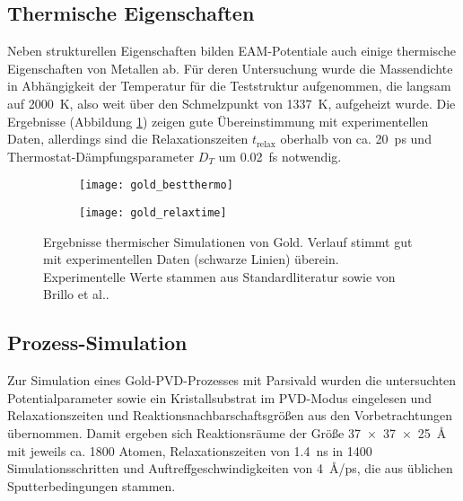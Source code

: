 
\subsection{Thermische Eigenschaften}

Neben strukturellen Eigenschaften bilden EAM-Potentiale auch einige thermische Eigenschaften von Metallen ab.
Für deren Untersuchung wurde die Massendichte in Abhängigkeit der Temperatur für die Teststruktur aufgenommen, die langsam auf \SI{2000}{\kelvin}, also weit über den Schmelzpunkt von \SI{1337}{\kelvin}, aufgeheizt wurde.
Die Ergebnisse (Abbildung \ref{fig:goldthermo}) zeigen gute Übereinstimmung mit experimentellen Daten, allerdings sind die Relaxationszeiten $t_\text{relax}$ oberhalb von ca. \SI{20}{\pico\second} und Thermostat-Dämpfungsparameter $D_T$ um \SI{0.02}{\femto\second} notwendig.

\begin{figure}[tbp]
  \centering
  \captionsetup[subfigure]{singlelinecheck=false}
  \def\subfigwidth{7cm}
  \begin{subfigure}[t]{\subfigwidth}
    \texttt{[image: gold\_bestthermo]}
  \end{subfigure}
  \hfill
  \begin{subfigure}[t]{\subfigwidth}
    \texttt{[image: gold\_relaxtime]}
  \end{subfigure}
  \caption[Ergebnisse thermischer Simulationen von Gold]{Ergebnisse thermischer Simulationen von Gold.
    Verlauf stimmt gut mit experimentellen Daten (schwarze Linien) überein.
    Experimentelle Werte stammen aus Standardliteratur sowie von Brillo et al.\cite{brillo_density_2006}.
  }
  \label{fig:goldthermo}
\end{figure}

\subsection{Prozess-Simulation}

Zur Simulation eines Gold-PVD-Prozesses mit Parsivald wurden die untersuchten Potentialparameter sowie ein Kristallsubstrat im PVD-Modus eingelesen und Relaxationszeiten und Reaktionsnachbarschaftsgrößen aus den Vorbetrachtungen übernommen.
Damit ergeben sich Reaktionsräume der Größe \SI{37x37x25}{\angstrom} mit jeweils ca. \num{1800} Atomen, Relaxationszeiten von \SI{1.4}{\nano\second} in \num{1400} Simulationsschritten und Auftreffgeschwindigkeiten von \SI{4}{\angstrom/\pico\second}, die aus üblichen Sputterbedingungen stammen.

